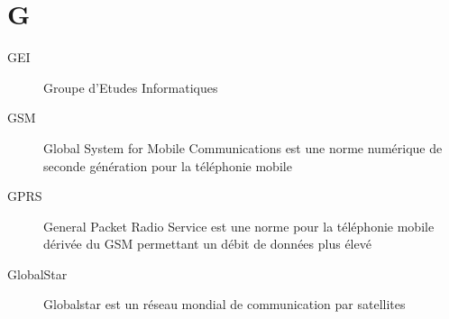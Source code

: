 \section{G}

\begin{description}

\item[GEI] Groupe d'Etudes Informatiques

\item[GSM] Global System for Mobile Communications est une norme numérique de seconde génération pour la téléphonie mobile

\item[GPRS] General Packet Radio Service est une norme pour la téléphonie mobile dérivée du GSM permettant un débit de données plus élevé

\item[GlobalStar] Globalstar est un réseau mondial de communication par satellites

\end{description}
